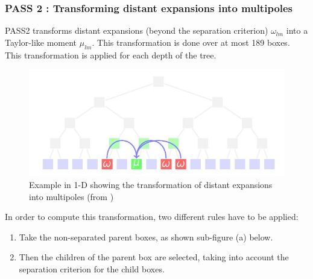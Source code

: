 \documentclass[11pt,twoside,a4paper]{report}
\begin{document}
   
   	\subsubsection{PASS 2 : Transforming distant expansions into multipoles}
   	
   PASS2 transforms distant expansions (beyond the separation criterion) $\omega_{lm}$ into a Taylor-like moment $\mu_{lm}$. This transformation is done over at most 189 boxes. This transformation is applied for each depth of the tree.  
   	
   	
 \begin{figure}[H]
 	\label{fig:M2L}
   \includegraphics[scale=0.8]{transformExpansions1}
    \centering 
    \caption{Example in 1-D showing the transformation of distant expansions into multipoles (from \cite{phdIvo})}
    
   \end{figure}
   
	In order to compute this transformation, two different rules have to be applied:
	
	\begin{enumerate}	
	\item Take the non-separated parent boxes, as shown sub-figure (a) below.
	\item Then the children of the parent box are selected, taking into account the separation criterion for the child boxes.	
	\end{enumerate}	   
   
\end{document}
